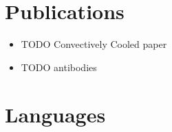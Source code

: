 \documentclass{resume}
\begin{document}
\section{Publications}
\begin{itemize}
    \item TODO Convectively Cooled paper
    \item TODO antibodies
\end{itemize}

\section{Languages}
\begin{itemize}
\end{itemize}
\end{document}
